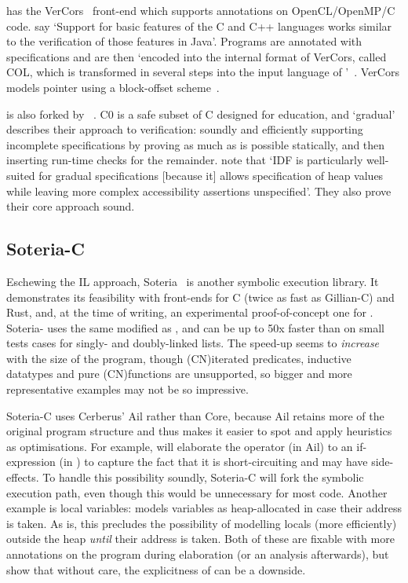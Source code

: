  has the VerCors~ front-end which supports
annotations on OpenCL/OpenMP/C code.  say
`Support for basic features of the C and C++ languages works similar to the
verification of those features in Java'. Programs are annotated with
specifications and are then `encoded into the internal format of VerCors,
called COL, which is transformed in several steps into the input language of
'~. VerCors models pointer using a
block-offset scheme~.

 is also forked by ~.
C0 is a safe subset of C designed for education, and `gradual'
describes their approach to verification: soundly and efficiently
supporting incomplete specifications by proving as much as is possible statically,
and then inserting run-time checks for the remainder.
 note that `IDF is particularly well-suited
for gradual specifications [because it] allows specification of heap values
while leaving more complex accessibility assertions unspecified'. They also
prove their core approach sound.

\subsection{Soteria-C}

Eschewing the IL approach, Soteria~ is another
symbolic execution library. It demonstrates its feasibility with front-ends for
C (twice as fast as Gillian-C) and Rust, and, at the time of writing, an
experimental proof-of-concept one for .
Soteria- uses
the same modified  as , and can be up to 50x faster than  on small tests cases for
singly- and doubly-linked lists. The speed-up seems to \emph{increase} with the
size of the program, though \kl(CN){iterated predicates}, inductive datatypes and
pure \kl(CN){functions} are unsupported, so bigger and more representative
examples may not be so impressive.

Soteria-C uses Cerberus' Ail rather than Core, because Ail retains more
of the original program structure and thus makes it easier to spot and apply
heuristics as optimisations. For example,
 will elaborate the \cinline{&&} operator (in Ail) to an if-expression
(in ) to capture the fact that it is short-circuiting and may have
side-effects. To handle this possibility soundly, Soteria-C will fork the
symbolic execution path, even though this would be unnecessary for most code.
Another example is local variables:  models variables as heap-allocated
in case their address is taken. As is, this precludes the possibility of
modelling locals (more efficiently) outside the heap \emph{until} their address
is taken. Both of these are fixable with more annotations on the 
program during elaboration (or an analysis afterwards), but show that without
care, the explicitness of  can be a downside.

